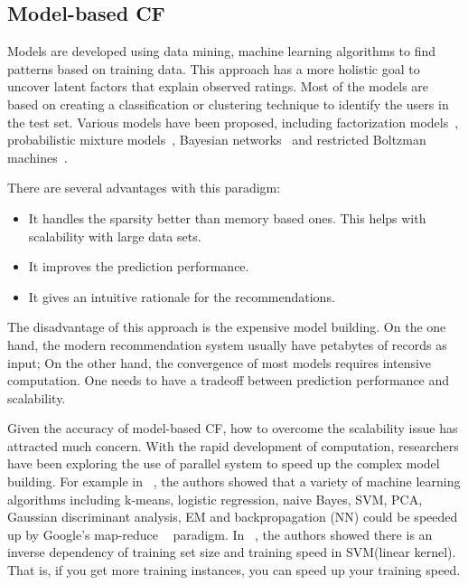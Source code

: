 \hspace{0.05in}
\subsection{Model-based CF}
Models are developed using data mining, machine learning algorithms to find patterns based on training data. This approach has a more holistic goal to uncover latent factors that explain observed ratings. Most of the models are based on creating a classification or clustering technique to identify the users in the test set.
Various models have been proposed, including factorization models~\cite{/computer/yehuda09matrix, /aaai/WPan12,paterek07,/tist/LibFM-TIST12},
probabilistic mixture models~\cite{hofmann04cf,jin:decoupled}, Bayesian networks~\cite{pennock00pd} and restricted Boltzman machines~\cite{/icml/SalakhutdinovMH07}.

There are several advantages with this paradigm:
\begin{itemize}
\item It handles the sparsity better than memory based ones. This helps with scalability with large data sets.
\item It improves the prediction performance.
\item It gives an intuitive rationale for the recommendations.
\end{itemize}

The disadvantage of this approach is the expensive model building. On the one hand, the modern recommendation system usually have petabytes of records as input; On the other hand, the convergence of most models requires intensive computation. One needs to have a tradeoff between prediction performance and scalability.

Given the accuracy of model-based CF, how to overcome the scalability issue has attracted much concern. With the rapid development of computation, researchers have been exploring the use of parallel system to speed up the complex model building. For example in ~\cite{chu2007map}, the authors showed that a variety of machine learning algorithms including k-means, logistic regression, naive Bayes, SVM, PCA, Gaussian discriminant analysis, EM and backpropagation (NN) could be speeded up by Google's map-reduce ~\cite{dean2008mapreduce} paradigm. In ~\cite{Shalev-Shwartz:2008:SOI:1390156.1390273}, the authors showed there is an inverse dependency of training set size and training speed in SVM(linear kernel). That is, if you get more training instances, you can speed up your training speed.


